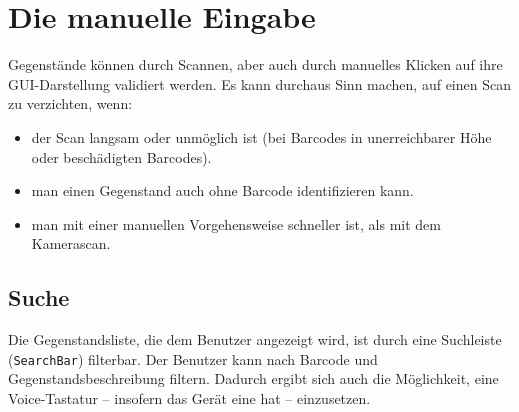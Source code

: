 \begin{Shaded}
\begin{Highlighting}[]
  \NormalTok{(}
    \NormalTok{) \{}
        \NormalTok{) \{}
            \NormalTok{(}\NormalTok{);}
\NormalTok{        \}}
\NormalTok{\}}
\end{Highlighting}
\end{Shaded}

\hypertarget{die-manuelle-eingabe}{%
\section{Die manuelle Eingabe}\label{die-manuelle-eingabe}}

Gegenstände können durch Scannen, aber auch durch manuelles Klicken auf
ihre GUI-Darstellung validiert werden. Es kann durchaus Sinn machen, auf
einen Scan zu verzichten, wenn:

\begin{itemize}
\tightlist
\item
  der Scan langsam oder unmöglich ist (\zB bei Barcodes in
  unerreichbarer Höhe oder beschädigten Barcodes).
\item
  man einen Gegenstand auch ohne Barcode identifizieren kann.
\item
  man mit einer manuellen Vorgehensweise schneller ist, als mit dem
  Kamerascan.
\end{itemize}

\hypertarget{suche}{%
\subsection{Suche}\label{suche}}

Die Gegenstandsliste, die dem Benutzer angezeigt wird, ist durch eine
Suchleiste (\texttt{SearchBar}) filterbar. Der Benutzer kann nach
Barcode und Gegenstandsbeschreibung filtern. Dadurch ergibt sich auch
die Möglichkeit, eine Voice-Tastatur -- insofern das Gerät eine hat --
einzusetzen.

